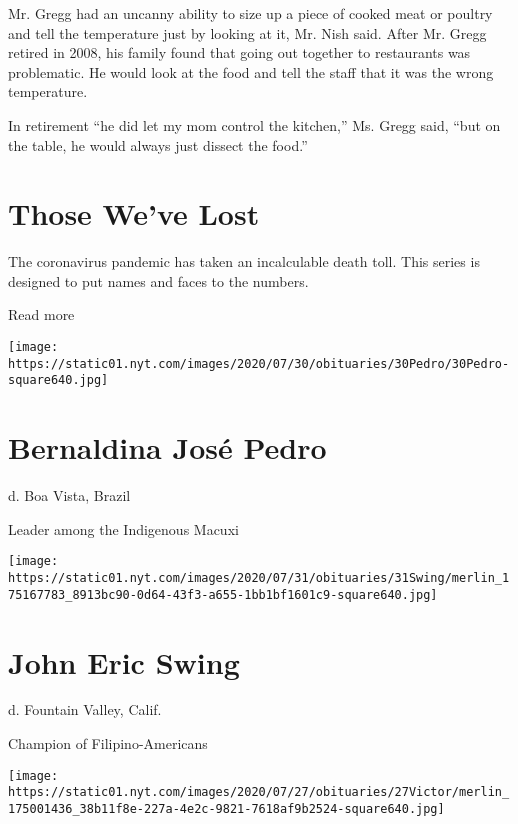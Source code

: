 Mr. Gregg had an uncanny ability to size up a piece of cooked meat or
poultry and tell the temperature just by looking at it, Mr. Nish said.
After Mr. Gregg retired in 2008, his family found that going out
together to restaurants was problematic. He would look at the food and
tell the staff that it was the wrong temperature.

In retirement ``he did let my mom control the kitchen,'' Ms. Gregg said,
``but on the table, he would always just dissect the food.''

\href{https://www.nytimes.com/interactive/2020/obituaries/people-died-coronavirus-obituaries.html?action=click\&pgtype=Article\&state=default\&region=BELOW_MAIN_CONTENT\&context=covid_obits_promo}{}

\hypertarget{those-weve-lost}{%
\section{Those We've Lost}\label{those-weve-lost}}

The coronavirus pandemic has taken an incalculable death toll. This
series is designed to put names and faces to the numbers.

Read more

\texttt{[image: https://static01.nyt.com/images/2020/07/30/obituaries/30Pedro/30Pedro-square640.jpg]}

\hypertarget{bernaldina-josuxe9-pedro}{%
\section{Bernaldina José Pedro}\label{bernaldina-josuxe9-pedro}}

d. Boa Vista, Brazil

Leader among the Indigenous Macuxi

\texttt{[image: https://static01.nyt.com/images/2020/07/31/obituaries/31Swing/merlin\_175167783\_8913bc90-0d64-43f3-a655-1bb1bf1601c9-square640.jpg]}

\hypertarget{john-eric-swing}{%
\section{John Eric Swing}\label{john-eric-swing}}

d. Fountain Valley, Calif.

Champion of Filipino-Americans

\texttt{[image: https://static01.nyt.com/images/2020/07/27/obituaries/27Victor/merlin\_175001436\_38b11f8e-227a-4e2c-9821-7618af9b2524-square640.jpg]}


